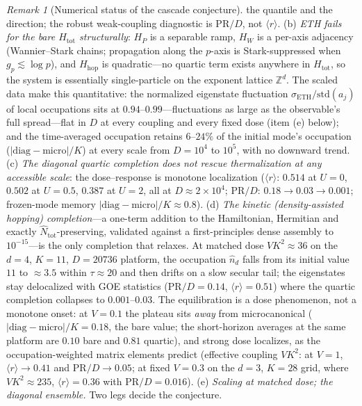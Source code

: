 \documentclass[11pt,a4paper]{article}
\theoremstyle{plain}
\theoremstyle{definition}
\theoremstyle{remark}
\newtheorem{remark}[theorem]{Remark}
\newcommand{\Zz}{\mathbb{Z}}
\newcommand{\Nhat}{\widehat{N}}
\begin{document}
\begin{remark}[Numerical status of the cascade conjecture]
the quantile and the direction; the robust weak-coupling diagnostic is $\mathrm{PR}/D$,
not $\langle r\rangle$. (b) \emph{ETH fails for the bare $H_{\mathrm{tot}}$
structurally}: $H_{P}$ is a separable ramp, $H_{W}$ is a per-axis adjacency
(Wannier--Stark chains; propagation along the $p$-axis is Stark-suppressed when
$g_{p}\lesssim\log p$), and $H_{\mathrm{hop}}$ is quadratic---no quartic term exists
anywhere in $H_{\mathrm{tot}}$, so the system is essentially single-particle on the
exponent lattice $\Zz^{d}$. The scaled data make this quantitative: the normalized
eigenstate fluctuation $\sigma_{\mathrm{ETH}}/\mathrm{std}(a_{j})$ of local
occupations sits at $0.94$--$0.99$---fluctuations as large as the observable's full
spread---flat in $D$ at every coupling and every fixed dose (item (e) below); and the
time-averaged occupation retains
$6$--$24\%$ of the initial mode's occupation
($|\mathrm{diag}-\mathrm{micro}|/K$) at every scale from $D=10^{4}$ to $10^{5}$,
with no downward trend. (c) \emph{The diagonal quartic completion does not rescue
thermalization at any accessible scale}: the dose--response is monotone
localization ($\langle r\rangle$: $0.514$ at $U=0$, $0.502$ at $U=0.5$, $0.387$ at
$U=2$, all at $D\approx2\times10^{4}$; $\mathrm{PR}/D$: $0.18\to0.03\to0.001$;
frozen-mode memory $|\mathrm{diag}-\mathrm{micro}|/K\approx0.8$). (d) \emph{The kinetic (density-assisted hopping) completion}---a one-term addition to
the Hamiltonian, Hermitian and exactly $\Nhat_{\mathrm{tot}}$-preserving, validated against a
first-principles dense assembly to $10^{-15}$---is the only completion that relaxes. At
matched dose $VK^{2}\approx36$ on the $d=4$, $K=11$, $D=20736$ platform, the occupation
$\hat n_{d}$ falls from its initial value $11$ to $\approx3.5$ within $\tau\approx20$ and then
drifts on a slow secular tail; the eigenstates stay delocalized with GOE statistics
($\mathrm{PR}/D=0.14$, $\langle r\rangle=0.51$) where the quartic completion collapses to
$0.001$--$0.03$. The equilibration is a dose phenomenon, not a monotone onset: at $V=0.1$
the plateau sits \emph{away} from microcanonical ($|\mathrm{diag}-\mathrm{micro}|/K=0.18$,
the bare value; the short-horizon averages at the same platform are $0.10$ bare and $0.81$
quartic), and strong dose localizes, as the occupation-weighted matrix elements predict
(effective coupling $VK^{2}$: at $V=1$, $\langle r\rangle\to0.41$ and
$\mathrm{PR}/D\to0.05$; at fixed $V=0.3$ on the $d=3$, $K=28$ grid, where
$VK^{2}\approx235$, $\langle r\rangle=0.36$ with $\mathrm{PR}/D=0.016$).
(e) \emph{Scaling at matched dose; the diagonal ensemble.} Two legs decide the conjecture.

\end{remark}
\end{document}
